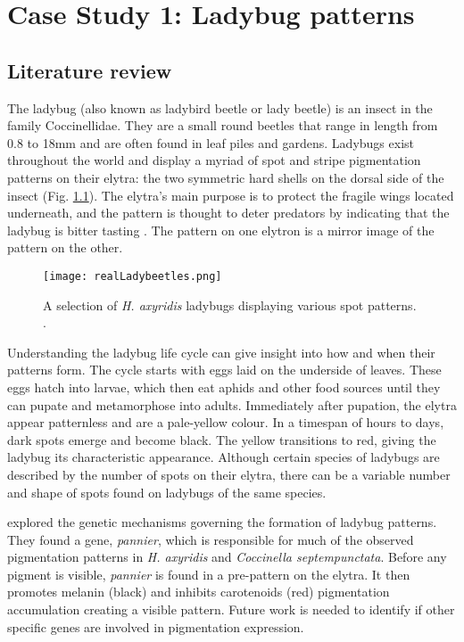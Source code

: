 \chapter{Case Study 1: Ladybug patterns}
\section{Literature review}
The ladybug (also known as ladybird beetle or lady beetle) is an insect in the family Coccinellidae. They are a small round beetles that range in length from 0.8 to 18mm \citep{King1996} and are often found in leaf piles and gardens. Ladybugs exist throughout the world and display a myriad of spot and stripe pigmentation patterns on their elytra: the two symmetric hard shells on the dorsal side of the insect (Fig. \ref{fig:realLadyBugPatterns}). The elytra's main purpose is to protect the fragile wings located underneath, and the pattern is thought to deter predators by indicating that the ladybug is bitter tasting \citep{King1996}. The pattern on one elytron is a mirror image of the pattern on the other. 

\begin{figure}[ht]
	\centering
	\texttt{[image: realLadybeetles.png]}
	\caption[A selection of \textit{Harmonia axyridis} ladybugs displaying various spot patterns]{A selection of \textit{H. axyridis} ladybugs displaying various spot patterns. .}
	\label{fig:realLadyBugPatterns}
\end{figure}

Understanding the ladybug life cycle can give insight into how and when their patterns form. The cycle starts with eggs laid on the underside of leaves. These eggs hatch into larvae, which then eat aphids and other food sources until they can pupate and metamorphose into adults. Immediately after pupation, the elytra appear patternless and are a pale-yellow colour. In a timespan of hours to days, dark spots emerge and become black. The yellow transitions to red, giving the ladybug its characteristic appearance. Although certain species of ladybugs are described by the number of spots on their elytra, there can be a variable number and shape of spots found on ladybugs of the same species.

\citet{Ando2018} explored the genetic mechanisms governing the formation of ladybug patterns. They found a gene, \textit{pannier}, which is responsible for much of the observed pigmentation patterns in \textit{H. axyridis} and \textit{Coccinella septempunctata}. Before any pigment is visible, \textit{pannier} is found in a pre-pattern on the elytra. It then promotes melanin (black) and inhibits carotenoids (red) pigmentation accumulation creating a visible pattern. Future work is needed to identify if other specific genes are involved in pigmentation expression.

